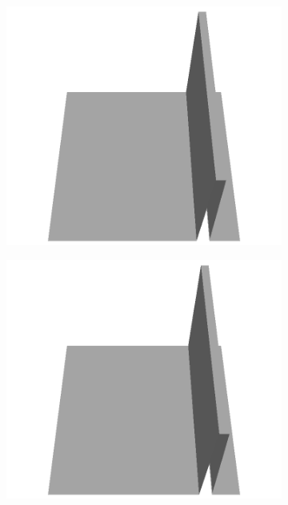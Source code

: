 \documentclass[../document.tex]{subfiles}
\begin{document}
\begin{figure}[H]
\begin{subfigure}[b]{0.065\textwidth}
    \includegraphics[width=\linewidth]{../img/5/custom_patches/walls_front/all/25-3d.png}
    \end{subfigure}
    \begin{subfigure}[b]{0.065\textwidth}
    \includegraphics[width=\linewidth]{../img/5/custom_patches/walls_front/all/24-3d.png}
    \end{subfigure}
    \begin{subfigure}[b]{0.065\textwidth}

\end{subfigure}
\end{figure}
\end{document}
